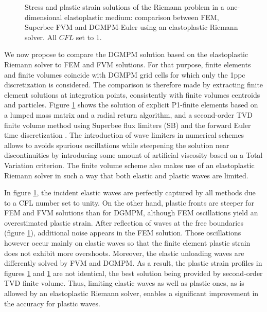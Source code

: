 \begin{figure}[h!]
  \centering
  { \label{subfig:ep_dgmpm_fvm1}}
  { \label{subfig:ep_dgmpm_fvm3}}
  {}
  \caption{Stress and plastic strain solutions of the Riemann problem in a one-dimensional elastoplastic medium: comparison between FEM, Superbee FVM and DGMPM-Euler using an elastoplastic Riemann solver. All $CFL$ set to $1$.}
  \label{fig:RP_EP_dgmpm_fvm}
\end{figure}


We now propose to compare the DGMPM solution based on the elastoplastic Riemann solver to FEM and FVM solutions.
For that purpose, finite elements and finite volumes coincide with DGMPM grid cells for which only the 1ppc discretization is considered.
The comparison is therefore made by extracting finite element solutions at integration points, consistently with finite volumes centroids and particles.
Figure \ref{fig:RP_EP_dgmpm_fvm} shows the solution of explicit P1-finite elements based on a lumped mass matrix and a radial return algorithm, and a second-order TVD finite volume method using Superbee flux limiters (SB) and the forward Euler time discretization \cite{Thomas_EP}.
The introduction of wave limiters in numerical schemes allows to avoids spurious oscillations while steepening the solution near discontinuities by introducing some amount of artificial viscosity based on a Total Variation criterion.
The finite volume scheme also makes use of an elastoplastic Riemann solver in such a way that both elastic and plastic waves are limited.

In figure \ref{fig:RP_EP_dgmpm_fvm}, the incident elastic waves are perfectly captured by all methods due to a CFL number set to unity.
On the other hand, plastic fronts are steeper for FEM and FVM solutions than for DGMPM, although FEM oscillations yield an overestimated plastic strain. 
After reflection of waves at the free boundaries (figure \ref{fig:RP_EP_dgmpm_fvm}), additional noise appears in the FEM solution.
Those oscillations however occur mainly on elastic waves so that the finite element plastic strain does not exhibit more overshoots.
Moreover, the elastic unloading waves are differently solved by FVM and DGMPM.
As a result, the plastic strain profiles in figures \ref{fig:RP_EP_dgmpm_fvm} and \ref{fig:RP_EP_dgmpm_fvm} are not identical, the best solution being provided by second-order TVD finite volume. %
Thus, limiting elastic waves as well as plastic ones, as is allowed by an elastoplastic Riemann solver, enables a significant improvement in the accuracy for plastic waves.

